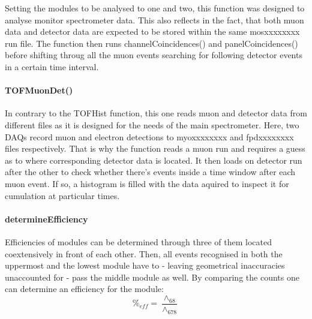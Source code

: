     Setting the modules to be analysed to one and two, this function was designed to analyse monitor spectrometer data. This also reflects in the fact, that both muon data and detector data are expected to be stored within the same mosxxxxxxxx run file. The function then runs channelCoincidences() and panelCoincidences() before shifting throug all the muon events searching for following detector events in a certain time interval.
    
    \paragraph{TOFMuonDet()}
    \label{ch:Analysis software:sec:methods of the class run:subsec:TOFMuonDet()}
    
    In contrary to the TOFHist function, this one reads muon and detector data from different files as it is designed for the needs of the main spectrometer. Here, two DAQs record muon and electron detections to myoxxxxxxxx and fpdxxxxxxxx files respectively. That is why the function reads a muon run and requires a guess as to where corresponding detector data is located. It then loads on detector run after the other to check whether there's events inside a time window after each muon event. If so, a histogram is filled with the data aquired to inspect it for cumulation at particular times. 
    
    \paragraph{determineEfficiency}
    \label{ch:Analysis software:sec:methods of the class run:subsec:determineEfficiency}
    
    Efficiencies of modules can be determined through three of them located coextensively in front of each other. Then, all events recognised in both the uppermost and the lowest module have to - leaving geometrical inaccuracies unaccounted for - pass the middle module as well. By comparing the counts one can determine an efficiency for the module:
    \begin{equation}
    	\%_{eff} = \frac{\wedge_{68}}{{\wedge_{678}}}
    \end{equation}
    
    
    
